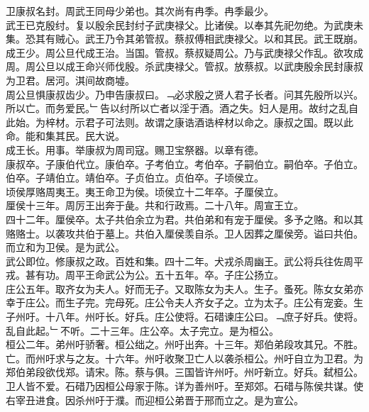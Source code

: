 \documentclass{zhvt-classic}
\begin{document}
\hspace*{2em}卫康叔名封。周武王同母少弟也。其次尚有冉季。冉季最少。\\
\hspace*{2em}武王已克殷纣。复以殷余民封纣子武庚禄父。比诸侯。以奉其先祀勿绝。为武庚未集。恐其有贼心。武王乃令其弟管叔。蔡叔傅相武庚禄父。以和其民。武王既崩。成王少。周公旦代成王治。当国。管叔。蔡叔疑周公。乃与武庚禄父作乱。欲攻成周。周公旦以成王命兴师伐殷。杀武庚禄父。管叔。放蔡叔。以武庚殷余民封康叔为卫君。居河。淇间故商墟。\\
\hspace*{2em}周公旦惧康叔齿少。乃申告康叔曰。﹁必求殷之贤人君子长者。问其先殷所以兴。所以亡。而务爱民。﹂告以纣所以亡者以淫于酒。酒之失。妇人是用。故纣之乱自此始。为梓材。示君子可法则。故谓之康诰酒诰梓材以命之。康叔之国。既以此命。能和集其民。民大说。\\
\hspace*{2em}成王长。用事。举康叔为周司寇。赐卫宝祭器。以章有德。\\
\hspace*{2em}康叔卒。子康伯代立。康伯卒。子考伯立。考伯卒。子嗣伯立。嗣伯卒。子伯立。伯卒。子靖伯立。靖伯卒。子贞伯立。贞伯卒。子顷侯立。\\
\hspace*{2em}顷侯厚赂周夷王。夷王命卫为侯。顷侯立十二年卒。子厘侯立。\\
\hspace*{2em}厘侯十三年。周厉王出奔于彘。共和行政焉。二十八年。周宣王立。\\
\hspace*{2em}四十二年。厘侯卒。太子共伯余立为君。共伯弟和有宠于厘侯。多予之赂。和以其赂赂士。以袭攻共伯于墓上。共伯入厘侯羡自杀。卫人因葬之厘侯旁。谥曰共伯。而立和为卫侯。是为武公。\\
\hspace*{2em}武公即位。修康叔之政。百姓和集。四十二年。犬戎杀周幽王。武公将兵往佐周平戎。甚有功。周平王命武公为公。五十五年。卒。子庄公扬立。\\
\hspace*{2em}庄公五年。取齐女为夫人。好而无子。又取陈女为夫人。生子。蚤死。陈女女弟亦幸于庄公。而生子完。完母死。庄公令夫人齐女子之。立为太子。庄公有宠妾。生子州吁。十八年。州吁长。好兵。庄公使将。石碏谏庄公曰。﹁庶子好兵。使将。乱自此起。﹂不听。二十三年。庄公卒。太子完立。是为桓公。\\
\hspace*{2em}桓公二年。弟州吁骄奢。桓公绌之。州吁出奔。十三年。郑伯弟段攻其兄。不胜。亡。而州吁求与之友。十六年。州吁收聚卫亡人以袭杀桓公。州吁自立为卫君。为郑伯弟段欲伐郑。请宋。陈。蔡与俱。三国皆许州吁。州吁新立。好兵。弑桓公。卫人皆不爱。石碏乃因桓公母家于陈。详为善州吁。至郑郊。石碏与陈侯共谋。使右宰丑进食。因杀州吁于濮。而迎桓公弟晋于邢而立之。是为宣公。\\
\end{document}
